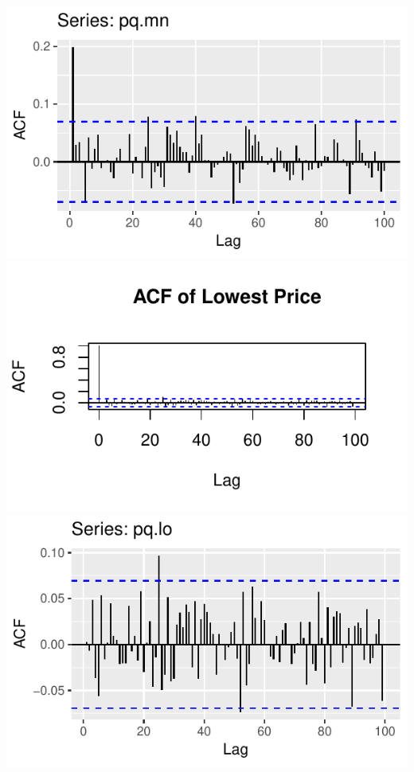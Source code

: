 \documentclass[]{tufte-book}
\begin{document}
\includegraphics{binary-forex-trading-Q1_files/figure-latex/acf-pacf-16}
\includegraphics{binary-forex-trading-Q1_files/figure-latex/acf-pacf-17}
\includegraphics{binary-forex-trading-Q1_files/figure-latex/acf-pacf-18}
\end{document}
